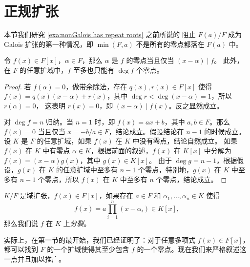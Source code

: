 \section{正规扩张}

本节我们研究 \autoref{exa:nonGalois has repeat roots} 之前所说的
阻止 $F(a)/F$ 成为 Galois 扩张的第一种情况，即 $\min(F,a)$
不是所有的零点都落在 $F(a)$ 中。

\begin{lemma}
  令 $f(x)\in F[x]$，$\alpha\in F$，那么 $\alpha$ 是 $f$ 的零点当且仅当 $(x-\alpha)\mid f$。
  此外，在 $F$ 的任意扩域中，$f$ 至多也只能有 $\deg f$ 个零点。
\end{lemma}
\begin{proof}
  若 $f(\alpha)=0$，做带余除法，存在 $q(x),r(x)\in F[x]$ 使得
  $f(x)=q(x)(x-\alpha)+r(x)$，其中 $\deg r<\deg (x-\alpha)=1$，所以 $r(\alpha)=0$，
  这表明 $r(x)=0$，即 $(x-\alpha)\mid f(x)$。反之显然成立。

  对 $\deg f=n$ 归纳。当 $n=1$ 时，即 $f(x)=ax+b$，其中 $a,b\in F$。那么
  $f(x)=0$ 当且仅当 $x=-b/a\in F$，结论成立。假设结论在 $n-1$ 的时候成立。
  设 $K$ 是 $F$ 的任意扩域，如果 $f(x)$ 在 $K$ 中没有零点，结论自然成立。
  如果 $f(x)$ 在 $K$ 中有零点 $\alpha\in K$，根据前面的叙述，$f(x)$
  在 $K[x]$ 中分解为 $f(x)=(x-\alpha)g(x)$，其中 $g(x)\in K[x]$。
  由于 $\deg g=n-1$，根据假设，$g(x)$ 在 $K$ 的任意扩域中至多有 $n-1$
  个零点，特别地，$g(x)$ 在 $K$ 中至多有 $n-1$ 个零点，所以 $f(x)$
  在 $K$ 中至多有 $n$ 个零点，结论成立。
\end{proof}

\begin{definition}
  $K/F$ 是域扩张，$f(x)\in F[x]$，如果存在 $a\in F$ 和 $\alpha_1,\dots,\alpha_n\in K$
  使得
  \[
    f(x)=a\prod_{i=1}^n (x-\alpha_i)\in K[x],  
  \]
  那么我们说 $f$ 在 $K$ 上\emph{分裂}。
\end{definition}

实际上，在第一节的最开始，我们已经证明了：对于任意多项式 $f(x)\in F[x]$，
都可以找到 $F$ 的一个扩域使得其至少包含 $f$ 的一个零点。现在我们来严格叙述这一点并且加以推广。


